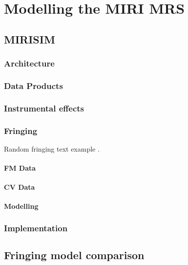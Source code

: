\chapter{Modelling the MIRI MRS}
\section{MIRISIM}
\subsection{Architecture}
\subsection{Data Products}
\subsection{Instrumental effects}
\subsection{Fringing}
Random fringing text example \cite{ref:Argyriou2018}.
\subsubsection{FM Data}
\subsubsection{CV Data}
\subsubsection{Modelling}
\subsection{Implementation}
\section{Fringing model comparison}